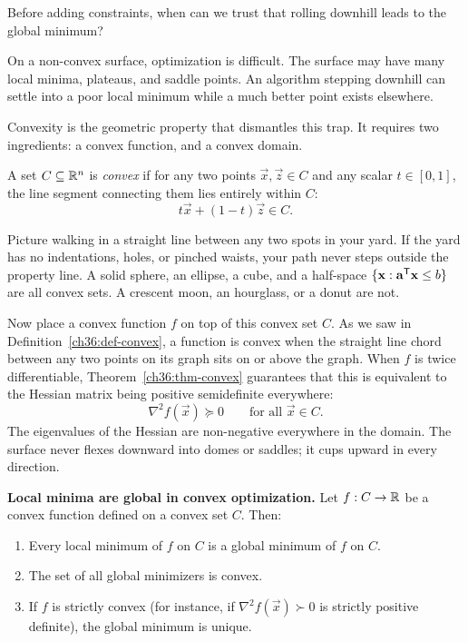 Before adding constraints, when can we trust that rolling downhill leads to the global minimum?

On a non-convex surface, optimization is difficult. The surface may have many local
minima, plateaus, and saddle points. An algorithm stepping downhill can settle into
a poor local minimum while a much better point exists elsewhere.

Convexity is the geometric property that dismantles this trap. It requires two ingredients: a convex function, and a convex domain.

\begin{definition}
\label{ch36:def-convex-set}
A set $C \subseteq \mathbb{R}^n$ is \emph{convex} if for any two points $\vec{x}, \vec{z} \in C$ and any scalar $t \in [0, 1]$, the line segment connecting them lies entirely within $C$:
\[
  t\vec{x} + (1-t)\vec{z} \in C.
\]
\end{definition}

Picture walking in a straight line between any two spots in your yard. If the yard has no indentations, holes, or pinched waists, your path never steps outside the property line. A solid sphere, an ellipse, a cube, and a half-space $\{\mathbf{x} : \mathbf{a}^{\mathsf{T}}\mathbf{x} \le b\}$ are all convex sets. A crescent moon, an hourglass, or a donut are not.

Now place a convex function $f$ on top of this convex set $C$. As we saw in Definition~\ref{ch36:def-convex}, a function is convex when the straight line chord between any two points on its graph sits on or above the graph. When $f$ is twice differentiable, Theorem~\ref{ch36:thm-convex} guarantees that this is equivalent to the Hessian matrix being positive semidefinite everywhere:
\[
  \nabla^2 f(\vec{x}) \succeq 0 \qquad \text{for all } \vec{x} \in C.
\]
The eigenvalues of the Hessian are non-negative everywhere in the domain. The surface never flexes downward into domes or saddles; it cups upward in every direction.

\begin{formalbox}
\label{ch36:thm-convex-global}
\textbf{Local minima are global in convex optimization.} Let $f : C \to \mathbb{R}$ be a convex function defined on a convex set $C$. Then:
\begin{enumerate}
  \item Every local minimum of $f$ on $C$ is a global minimum of $f$ on $C$.
  \item The set of all global minimizers is convex.
  \item If $f$ is strictly convex (for instance, if $\nabla^2 f(\vec{x}) \succ 0$ is strictly positive definite), the global minimum is unique.
\end{enumerate}
\end{formalbox}


